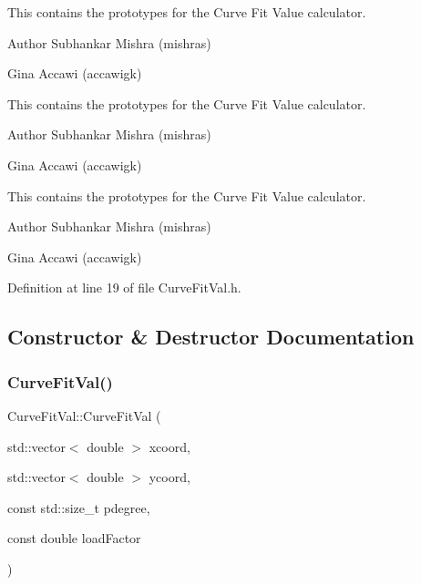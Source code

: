 This contains the prototypes for the Curve Fit Value calculator.

\begin{DoxyAuthor}{Author}
Subhankar Mishra (mishras) 

Gina Accawi (accawigk) 
\end{DoxyAuthor}


This contains the prototypes for the Curve Fit Value calculator.

\begin{DoxyAuthor}{Author}
Subhankar Mishra (mishras) 

Gina Accawi (accawigk) 
\end{DoxyAuthor}


This contains the prototypes for the Curve Fit Value calculator.

\begin{DoxyAuthor}{Author}
Subhankar Mishra (mishras) 

Gina Accawi (accawigk) 
\end{DoxyAuthor}


Definition at line 19 of file Curve\+Fit\+Val.\+h.



\subsection{Constructor \& Destructor Documentation}
\mbox{\label{class_curve_fit_val_ad58e4933db92ceb5b9a42276c398d034}} 
\subsubsection{\texorpdfstring{Curve\+Fit\+Val()}{CurveFitVal()}\hspace{0.1cm}{\footnotesize\ttfamily [1/3]}}
{\footnotesize\ttfamily Curve\+Fit\+Val\+::\+Curve\+Fit\+Val (\begin{DoxyParamCaption}\item[{std\+::vector$<$ double $>$}]{xcoord,  }\item[{std\+::vector$<$ double $>$}]{ycoord,  }\item[{const std\+::size\+\_\+t}]{pdegree,  }\item[{const double}]{load\+Factor }\end{DoxyParamCaption})\hspace{0.3cm}{\ttfamily [inline]}}

